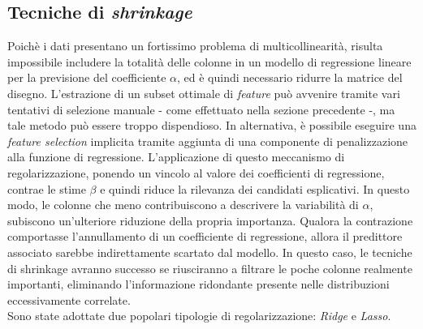 \documentclass[fleqn,10pt]{SelfArx} %
\begin{document}
\subsection{Tecniche di \textit{shrinkage}}
Poichè i dati presentano un fortissimo problema di multicollinearità, risulta impossibile includere la totalità delle colonne in un modello di regressione lineare per la previsione del coefficiente $\alpha$, ed è quindi necessario ridurre la matrice del disegno. L'estrazione di un subset ottimale di \textit{feature} può avvenire tramite vari tentativi di selezione manuale - come effettuato nella sezione precedente -, ma tale metodo può essere troppo dispendioso. In alternativa, è possibile eseguire una \textit{feature selection} implicita tramite aggiunta di una componente di penalizzazione alla funzione di regressione. L'applicazione di questo meccanismo di regolarizzazione, ponendo un vincolo al valore dei coefficienti di regressione, contrae le stime $\beta$ e quindi riduce la rilevanza dei candidati esplicativi. In questo modo, le colonne che meno contribuiscono a descrivere la variabilità di $\alpha$, subiscono un'ulteriore riduzione della propria importanza. Qualora la contrazione comportasse l'annullamento di un coefficiente di regressione, allora il predittore associato sarebbe indirettamente scartato dal modello. In questo caso, le tecniche di shrinkage avranno successo se riusciranno a filtrare le poche colonne realmente importanti, eliminando l'informazione ridondante presente nelle distribuzioni eccessivamente correlate.\\
Sono state adottate due popolari tipologie di regolarizzazione: \textit{Ridge} e \textit{Lasso}.
\end{document}
